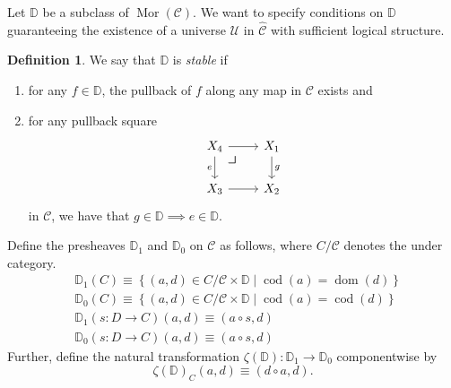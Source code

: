 \documentclass[10pt,letterpaper,cm]{nupset}
\theoremstyle{definition}
\newtheorem{definition}{Definition}[subsection]
\theoremstyle{theorem}
\theoremstyle{remark}
\DeclareMathOperator{\mor}{Mor}
\newcommand{\0}{\mathbf{0}}
\newcommand{\1}{\mathbf{1}}
\newcommand{\2}{\mathbf{2}}
\renewcommand{\c}{\mathscr{C}}
\DeclareMathOperator{\dom}{dom}
\DeclareMathOperator{\cod}{cod}
\newcommand{\be}{\begin{enumerate}}
\newcommand{\ee}{\end{enumerate}}
\begin{document}
Let $\mathbb{D}$ be a subclass of $\mor(\c)$. We want to specify conditions on $\mathbb{D}$ guaranteeing the existence of a universe $\mathcal{U}$ in $\widehat{\c}$ with sufficient logical structure. 

\begin{definition} We say that $\mathbb{D}$ is \textit{stable} if
\be[label=(\alph*)]
\item for any $f\in \mathbb{D}$, the pullback of $f$ along any map in $\c$ exists and 
\item for any pullback square
\[
\begin{tikzcd}
X_4 \arrow[r] \arrow[d, "e"']  \arrow[dr, phantom, "\scalebox{1.5}{\color{black}$\lrcorner$}" , very near start, color=black] & X_1 \arrow[d, "g"] \\
X_3 \arrow[r]                 & X_2               
\end{tikzcd}
\] in $\c$, we have that $g\in \mathbb{D} \implies e\in \mathbb{D}$.
\ee
\end{definition}

Define the presheaves $\mathbb{D}_1$ and $\mathbb{D}_0$ on $\c$ as follows, where $C/\c$ denotes the under category.
\begin{align*}
& \mathbb{D}_1(C)  \equiv \left\{\left(a,d\right) \in C/\c \times \mathbb{D} \mid \cod(a) = \dom(d)\right\}
\\[2pt] &\mathbb{D}_0(C)  \equiv \left\{\left(a,d\right) \in C/\c  \times \mathbb{D} \mid \cod(a) = \cod(d)\right\} 
\\[6pt]  & \mathbb{D}_1(s: D \to C)(a,d)  \equiv \left(a \circ s, d\right) 
\\[2pt]   &\mathbb{D}_0(s: D \to C)(a,d)  \equiv \left(a \circ s, d\right) 
\end{align*}
Further, define the natural transformation $\zeta(\mathbb{D}) :\mathbb{D}_1 \to \mathbb{D}_0$ componentwise by
\[
\zeta(\mathbb{D})_C(a,d) \equiv \left(d \circ a, d\right).
\] 
\end{document}

